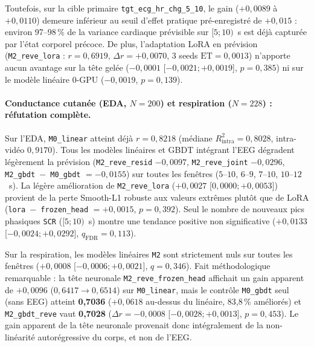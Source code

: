 \documentclass[10pt]{article}
\begin{document}
Toutefois, sur la cible primaire \texttt{tgt\_ecg\_hr\_chg\_5\_10}, le gain ($+0{,}0089$ à $+0{,}0110$) demeure inférieur au seuil d'effet pratique pré-enregistré de $+0{,}015$ : environ 97--98\,\% de la variance cardiaque prévisible sur $[5 ; 10)$~s est déjà capturée par l'état corporel précoce. De plus, l'adaptation LoRA en prévision (\texttt{M2\_reve\_lora} : $r = 0{,}6919$, $\Delta r = +0{,}0070$, 3 seeds $\text{ET} = 0{,}0013$) n'apporte aucun avantage sur la tête gelée ($-0{,}0001$ [$-0{,}0021 ; +0{,}0019$], $p = 0{,}385$) ni sur le modèle linéaire 0-GPU ($-0{,}0019$, $p = 0{,}139$).

\paragraph{Conductance cutanée (EDA, $N = 200$) et respiration ($N = 228$) : réfutation complète.}
Sur l'EDA, \texttt{M0\_linear} atteint déjà $r = 0{,}8218$ (médiane $R^2_{\text{intra}} = 0{,}8028$, intra-vidéo $0{,}9170$). Tous les modèles linéaires et GBDT intégrant l'EEG dégradent légèrement la prévision (\texttt{M2\_reve\_resid} $-0{,}0097$, \texttt{M2\_reve\_joint} $-0{,}0296$, \texttt{M2\_gbdt $-$ M0\_gbdt} $= -0{,}0155$) sur toutes les fenêtres ($5$--$10$, $6$--$9$, $7$--$10$, $10$--$12$~s). La légère amélioration de \texttt{M2\_reve\_lora} ($+0{,}0027$ [$0{,}0000 ; +0{,}0053$]) provient de la perte Smooth-L1 robuste aux valeurs extrêmes plutôt que de LoRA (\texttt{lora $-$ frozen\_head} $= +0{,}0015$, $p = 0{,}392$). Seul le nombre de nouveaux pics phasiques \texttt{SCR} ($[5 ; 10)$~s) montre une tendance positive non significative ($+0{,}0133$ [$-0{,}0024 ; +0{,}0292$], $q_{\text{FDR}} = 0{,}113$).

Sur la respiration, les modèles linéaires \texttt{M2} sont strictement nuls sur toutes les fenêtres ($+0{,}0008$ [$-0{,}0006 ; +0{,}0021$], $q = 0{,}346$). Fait méthodologique remarquable : la tête neuronale \texttt{M2\_reve\_frozen\_head} affichait un gain apparent de $+0{,}0096$ ($0{,}6417 \to 0{,}6514$) sur \texttt{M0\_linear}, mais le contrôle \texttt{M0\_gbdt} seul (sans EEG) atteint \textbf{0,7036} ($+0{,}0618$ au-dessus du linéaire, 83,8\,\% améliorés) et \texttt{M2\_gbdt\_reve} vaut \textbf{0,7028} ($\Delta r = -0{,}0008$ [$-0{,}0028 ; +0{,}0013$], $p = 0{,}453$). Le gain apparent de la tête neuronale provenait donc intégralement de la non-linéarité autorégressive du corps, et non de l'EEG.
\end{document}
